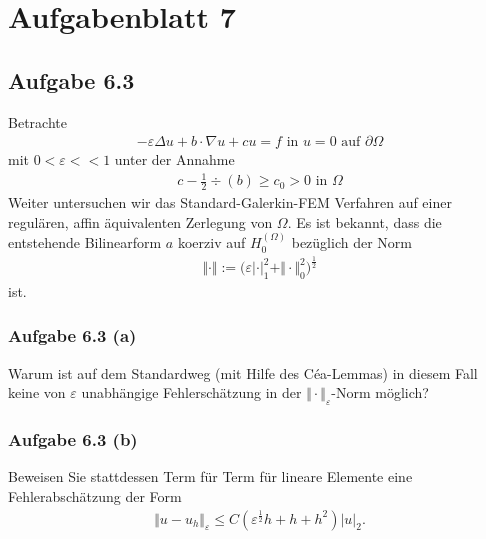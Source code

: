 
\section{Aufgabenblatt 7}
\subsection*{Aufgabe 6.3}
Betrachte
\begin{align*}
	-\varepsilon\Delta u+b\cdot\nabla u+cu=f\text{ in }u=0\text{ auf }\partial\Omega
\end{align*}
mit $0<\varepsilon<<1$ unter der Annahme
\begin{align*}
	c-\frac{1}{2}\div(b)\geq c_0>0\text{ in }\Omega
\end{align*}
Weiter untersuchen wir das Standard-Galerkin-FEM Verfahren auf einer regulären, affin äquivalenten Zerlegung von $\Omega$. 
Es ist bekannt, dass die entstehende Bilinearform $a$ koerziv auf $H_0^(\Omega)$ bezüglich der Norm
\begin{align*}
	\Vert\cdot\Vert:=\big(\varepsilon|\cdot|_1^2+\Vert\cdot\Vert_0^2\big)^{\frac{1}{2}}
\end{align*}
ist.
\subsubsection*{Aufgabe 6.3 (a)}
Warum ist auf dem Standardweg (mit Hilfe des Céa-Lemmas) in diesem Fall keine von $\varepsilon$ unabhängige Fehlerschätzung in der $\Vert\cdot\Vert_\varepsilon$-Norm möglich?

\begin{lösung}
\end{lösung}

\subsubsection*{Aufgabe 6.3 (b)}
Beweisen Sie stattdessen Term für Term für lineare Elemente eine Fehlerabschätzung der Form
\begin{align*}
	\Vert u-u_h\Vert_\varepsilon\leq C\left(\varepsilon^{\frac{1}{2}}h+h+h^2\right)|u|_2.
\end{align*}

